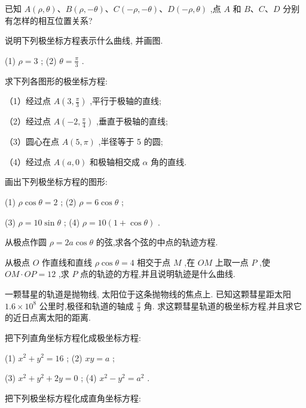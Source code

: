 \documentclass[lang=cn,newtx,10pt,scheme=chinese]{elegantbook}
\begin{document}
\begin{problemset}[习 题 十 四]

\item 已知 \(A\left( {\rho ,\theta }\right) \text{、}B\left( {\rho , - \theta }\right) \text{、}C\left( {-\rho , - \theta }\right) \text{、}D\left( {-\rho ,\theta }\right)\) ,点 \(A\) 和 \(B\text{、}C\text{、}D\) 分别有怎样的相互位置关系?

\item 说明下列极坐标方程表示什么曲线, 并画图.

(1) \(\rho = 3\) ; (2) \(\theta = \frac{\pi }{3}\) .

\item 求下列各图形的极坐标方程:

（1）经过点 \(A\left( {3,\frac{\pi }{3}}\right)\) ,平行于极轴的直线;

（2）经过点 \(A\left( {-2,\frac{\pi }{4}}\right)\) ,垂直于极轴的直线;

（3）圆心在点 \(A\left( {5,\pi }\right)\) ,半径等于 5 的圆;

（4）经过点 \(A\left( {a,0}\right)\) 和极轴相交成 \(\alpha\) 角的直线.

\item 画出下列极坐标方程的图形:

(1) \(\rho \cos \theta = 2\) ; (2) \(\rho = 6\cos \theta\) ;

(3) \(\rho = {10}\sin \theta\) ; (4) \(\rho = {10}\left( {1 + \cos \theta }\right)\) .

\item 从极点作圆 \(\rho = {2a}\cos \theta\) 的弦,求各个弦的中点的轨迹方程.

\item 从极点 \(O\) 作直线和直线 \(\rho \cos \theta = 4\) 相交于点 \(M\) ,在 \({OM}\) 上取一点 \(P\) ,使 \({OM} \cdot {OP} = {12}\) ,求 \(P\) 点的轨迹的方程,并且说明轨迹是什么曲线.

\item 一颗彗星的轨道是抛物线, 太阳位于这条抛物线的焦点上. 已知这颗彗星距太阳 \({1.6} \times {10}^{8}\) 公里时,极径和轨道的轴成 \(\frac{\pi }{3}\) 角. 求这颗彗星轨道的极坐标方程,并且求它的近日点离太阳的距离.

\item 把下列直角坐标方程化成极坐标方程:

(1) \({x}^{2} + {y}^{2} = {16}\) ; (2) \({xy} = a\) ;

(3) \({x}^{2} + {y}^{2} + {2y} = 0\) ; (4) \({x}^{2} - {y}^{2} = {a}^{2}\) .

\item 把下列极坐标方程化成直角坐标方程:


\end{problemset}
\end{document}
